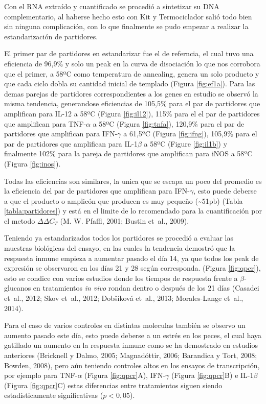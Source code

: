 \documentclass[12pt,letterpaper,oneside]{scrbook}
\begin{document}
Con el RNA extraído y cuantificado se procedió a sintetizar su DNA
complementario, al haberse hecho esto con Kit y Termociclador salió todo
bien sin ninguna complicación, con lo que finalmente se pudo empezar a
realizar la estandarización de partidores.

El primer par de partidores en estandarizar fue el de referncia, el cual
tuvo una eficiencia de 96,9\% y solo un peak en la curva de disociación
lo que nos corrobora que el primer, a 58ºC como temperatura de
annealing, genera un solo producto y que cada ciclo dobla su cantidad
inicial de templado (Figura \ref{fig:ef1a}). Para las demas parejas de
partidores correspondientes a los genes en estudio se observó la misma
tendencia, generandose eficiencias de 105,5\% para el par de partidores
que amplifican para IL-12 a 58ºC (Figura \ref{fig:il12}), 115\% para el
el par de partidores que amplifican para TNF-\(\alpha\) a 58ºC (Figura
\ref{fig:tnfa}), 120,9\% para el par de partidores que amplifican para
IFN-\(\gamma\) a 61,5ºC (Figura \ref{fig:ifng}), 105,9\% para el par de
partidores que amplifican para IL-1\(\beta\) a 58ºC (Figure
\ref{fig:il1b}) y finalmente 102\% para la pareja de partidores que
amplifican para iNOS a 58ºC (Figura \ref{fig:inos}).

Todas las eficiencias son similares, la unica que se escapa un poco del
promedio es la eficiencia del par de partidores que amplifican para
IFN-\(\gamma\), esto puede deberse a que el producto o amplicón que
producen es muy pequeño (\textasciitilde{}51pb) (Tabla
\ref{tabla:partidores}) y está en el limite de lo recomendado para la
cuantificación por el metodo \(\Delta\Delta C_T\) (M. W. Pfaffl, 2001;
Bustin et~al., 2009).

Teniendo ya estandarizados todos los partidores se procedió a evaluar
las muestras biológicas del ensayo, en las cuales la tendencia demostró
que la respuesta inmune empieza a aumentar pasado el día 14, ya que
todos los peak de expresión se observaron en los días 21 y 28 según
corresponda. (Figura \ref{fig:qpcr}), esto se condice con varios
estudios donde los tiempos de respuesta frente a \(\beta\)-glucanos en
tratamientos \emph{in vivo} rondan dentro o después de los 21 días
(Casadei et~al., 2012; Skov et~al., 2012; Dobšíková et~al., 2013;
Morales-Lange et~al., 2014).

Para el caso de varios controles en distintas moleculas también se
observo un aumento pasado este día, esto puede deberse a un estrés en
los peces, el cual haya gatillado un aumento en la respuesta inmune como
se ha demostrado en estudios anteriores (Bricknell y Dalmo, 2005;
Magnadóttir, 2006; Barandica y Tort, 2008; Bowden, 2008), pero aún
teniendo controles altos en los ensayos de transcripción, por ejemplo
para TNF-\(\alpha\) (Figura \ref{fig:qpcr}A), IFN-\(\gamma\) (Figura
\ref{fig:qpcr}B) e IL-1\(\beta\) (Figura \ref{fig:qpcr}C) estas
diferencias entre tratamientos siguen siendo estadísticamente
significativas (\(p < 0,05\)).
\end{document}
